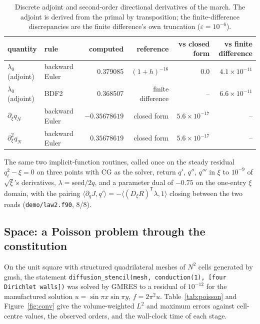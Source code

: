 \documentclass[11pt,a4paper]{article}
\newcommand{\tr}{^{\mathsf T}}
\newcommand{\code}[1]{\texttt{#1}}
\begin{document}
\begin{table}[H]
\centering\footnotesize
\begin{tabular}{@{}llrrrr@{}}
\toprule
quantity & rule & computed & reference & vs closed form & vs finite difference \\
\midrule
$\lambda_0$ (adjoint) & backward Euler & 0.379085 & $(1+h)^{-16}$ & $0.0$ & $4.1\times10^{-11}$ \\
$\lambda_0$ (adjoint) & BDF2 & 0.368507 & finite difference & -- & $6.6\times10^{-11}$ \\
$\partial_\xi q_N$ & backward Euler & $-0.35678619$ & closed form & $5.6\times10^{-17}$ & -- \\
$\partial_\xi^2 q_N$ & backward Euler & $\phantom{-}0.35678619$ & closed form & $5.6\times10^{-17}$ & -- \\
\bottomrule
\end{tabular}
\caption{Discrete adjoint and second-order directional derivatives of the march. The adjoint is derived from the primal by transposition; the finite-difference discrepancies are the finite difference's own truncation ($\varepsilon=10^{-6}$).}
\label{tab:exact}
\end{table}

The same two implicit-function routines, called once on the steady residual $q_i^2-\xi=0$ on three points with CG as the solver, return $q'$, $q''$, $q'''$ in $\xi$ to $10^{-9}$ of $\sqrt\xi$'s derivatives, $\lambda = \text{seed}/2q$, and a parameter dual of $-0.75$ on the one-entry $\xi$ domain, with the pairing $\langle\partial_qJ, q'\rangle = -\langle(D_\xi R)\tr\lambda, 1\rangle$ closing between the two roads (\code{demo/law2.f90}, 8/8).

\subsection{Space: a Poisson problem through the constitution}

On the unit square with structured quadrilateral meshes of $N^2$ cells generated by gmsh, the statement \code{diffusion\_stencil(mesh, conduction(1), [four Dirichlet walls])} was solved by GMRES to a residual of $10^{-12}$ for the manufactured solution $u=\sin\pi x\sin\pi y$, $f=2\pi^2u$. Table~\ref{tab:poisson} and Figure~\ref{fig:conv} give the volume-weighted $L^2$ and maximum errors against cell-centre values, the observed orders, and the wall-clock time of each stage.
\end{document}
